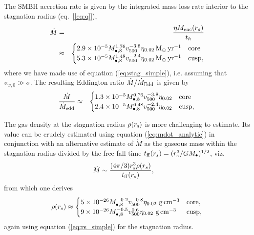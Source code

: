\documentclass[usenatbib,fleqn]{mn2e}
\newcommand{\eddr}{\dot{M}/\dot{M}_{\rm Edd}}
\newcommand{\rs}{r_s}
\newcommand{\Menc}{M_{\rm enc}}
\newcommand{\Mbheight}{M_{\bullet,8}}
\newcommand{\pyear}{{\rm yr}^{-1}}
\renewcommand{\th}{t_h}
\newcommand{\tff}{t_{\rm ff}}
\begin{document}
The SMBH accretion rate is given by the integrated mass loss rate interior to the stagnation radius (eq.~[\ref{eq:q}]), 
\begin{eqnarray}
  \dot{M} &=& \frac{\eta \Menc(\rs)}{\th} \nonumber \\
&\approx&
  \begin{cases}
    2.9 \times 10^{-5} M_{\bullet,8}^{1.76}
    v_{500}^{-3.8}  \eta_{0.02} \Msun \, \pyear& \text{core} \\
    5.3 \times 10^{-5} M_{\bullet,8}^{1.48} 
    v_{500}^{-2.4}  \eta_{0.02} \Msun \, \pyear  & \text{cusp}, 
  \end{cases}
  \label{eq:mdot_analytic}
\end{eqnarray}
where we have made use of equation (\ref{eq:stag_simple}), i.e. assuming that $v_{w,0} \gg \sigma$.  The resulting Eddington ratio $\eddr$ is given by 
\begin{eqnarray}
\frac{\dot{M}}{\dot{M}_{\rm edd}} &\approx&
  \begin{cases}
    1.3 \times 10^{-5} M_{\bullet,8}^{0.76}
    v_{500}^{-3.8}  \eta_{0.02}   & \text{core} \\
    2.4 \times 10^{-5} \Mbheight^{0.48} 
    v_{500}^{-2.4}  \eta_{0.02}   & \text{cusp}, 
  \end{cases}
  \label{eq:eddr_analytic}
\end{eqnarray}

The gas density at the stagnation radius $\rho(r_{\rm s})$ is more challenging to estimate.  Its value can be crudely estimated using equation (\ref{eq:mdot_analytic}) in conjunction with an alternative estimate of $\dot{M}$ as the gaseous mass within the stagnation radius divided by the free-fall time $t_{\rm ff}(\rs) = (r_{\rm s}^{3}/GM_{\bullet})^{1/2}$, viz.
\begin{align}
  &\dot{M}\sim\frac{(4 \pi/3) \rs^3 \rho(\rs)}{\tff(\rs)},
  \label{eq:mdot_gas}
\end{align}
from which one derives 
\begin{align}
  \rho(\rs)\approx
  \begin{cases}
    5 \times 10^{-26} \Mbheight^{-0.2} v_{500}^{-0.8}  \eta_{0.02} \,
    \, {\rm g \, cm^{-3}}& \text{core},\\
    9 \times 10^{-26}  \Mbheight^{-0.5} v_{500}^{0.6}  \eta_{0.02} \,\, {\rm g \,cm^{-3}} & \text{cusp},
  \end{cases}
  \label{eq:rhors}
\end{align}
again using equation (\ref{eq:rs_simple}) for the stagnation radius.  
\end{document}
